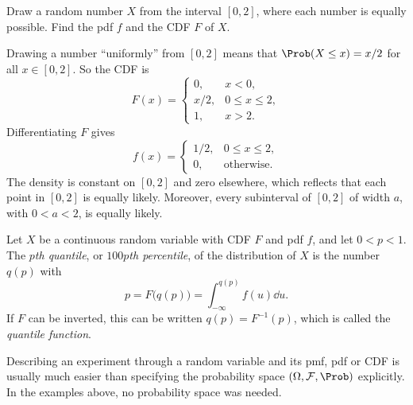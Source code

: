 \begin{example}\label{ex:uniform-0-2}
Draw a random number $X$ from the interval $[0, 2]$, where each number is equally possible. Find the pdf $f$ and the CDF $F$ of $X$.
\end{example}

\begin{solution}
Drawing a number ``uniformly'' from $[0, 2]$ means that $\Prob(X \le x) = x/2$ for all $x \in [0, 2]$. So the CDF is
\[
  F(x) = \begin{cases} 0, & x < 0, \\ x/2, & 0 \le x \le 2, \\ 1, & x > 2. \end{cases}
\]
Differentiating $F$ gives
\[
  f(x) = \begin{cases} 1/2, & 0 \le x \le 2, \\ 0, & \text{otherwise}. \end{cases}
\]
The density is constant on $[0, 2]$ and zero elsewhere, which reflects that each point in $[0, 2]$ is equally likely. Moreover, every subinterval of $[0, 2]$ of width $a$, with $0 < a < 2$, is equally likely.
\end{solution}

\begin{definition}\label{def:quantiles}
Let $X$ be a continuous random variable with CDF $F$ and pdf $f$, and let $0 < p < 1$. The \emph{$p$th quantile}, or \emph{$100p$th percentile}, of the distribution of $X$ is the number $q(p)$ with
\[
  p = F\bigl(q(p)\bigr) = \int_{-\infty}^{q(p)} f(u) \dd u.
\]
If $F$ can be inverted, this can be written $q(p) = F^{-1}(p)$, which is called the \emph{quantile function}.
\end{definition}

Describing an experiment through a random variable and its pmf, pdf or CDF is usually much easier than specifying the probability space $(\Omega, \mathcal{F}, \Prob)$ explicitly. In the examples above, no probability space was needed.
